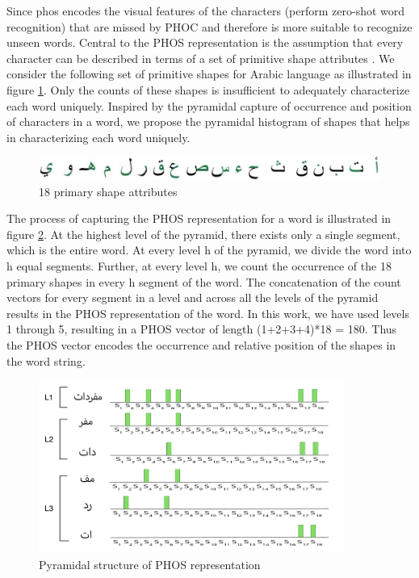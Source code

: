 Since \acrshort{phos} encodes the visual features of the characters (perform zero-shot word recognition) that are missed by PHOC and therefore is more suitable to recognize unseen words. Central to the PHOS representation is the assumption that every character can be described in terms of a set of primitive shape attributes \cite{ZEROSHOT}. We consider the following set of primitive shapes for Arabic language as illustrated in figure \ref{fig:arabic-primary-shape}. Only the counts of these shapes is insufficient to adequately characterize each word uniquely. Inspired by the pyramidal capture of occurrence and position of characters in a word, we propose the pyramidal histogram of shapes that helps in characterizing each word uniquely.

\begin{figure}[!htb]
    \centering
    \includegraphics[width=14cm]{images/arabic-letters.png}
    \caption{18 primary shape attributes}
    \label{fig:arabic-primary-shape}
\end{figure}


The process of capturing the PHOS representation for a word is illustrated in figure \ref{fig:phos-representation}. At the highest level of the pyramid, there exists only a single segment, which is the entire word. At every level h of the pyramid, we divide the word into h equal segments. Further, at every level h, we count the occurrence of the 18 primary shapes in every h segment of the word. The concatenation of the count vectors for every segment in a level and across all the levels of the pyramid results in the PHOS representation of the word. In this work, we have used levels 1 through 5, resulting in a PHOS vector of length (1+2+3+4)*18 = 180. Thus the PHOS vector encodes the occurrence and relative position of the shapes in the word string.

\begin{figure}[!htb]
    \centering
    \includegraphics[width=10cm]{images/phos_representation-arabic.png}
    \caption{Pyramidal structure of PHOS representation}
    \label{fig:phos-representation}
\end{figure}


